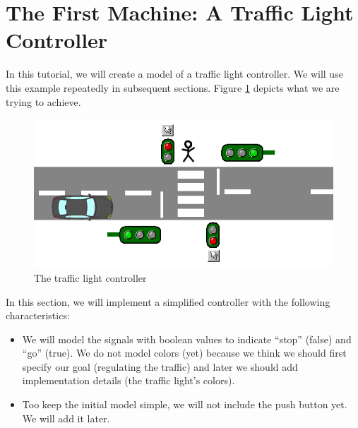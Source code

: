 \section{The First Machine: A Traffic Light Controller}
\label{tut_first_machine}



In this tutorial, we will create a model of a traffic light controller.  We will use this example repeatedly in subsequent sections.  Figure \ref{fig_tut_03_traffic_light} depicts what we are trying to achieve.

\begin{figure}[!ht]
\begin{center}
	\includegraphics[]{img/tutorial/tut_03_trafficlight.png}
	\caption{The traffic light controller}
	\label{fig_tut_03_traffic_light}
\end{center}
\end{figure}

In this section, we will implement a simplified controller with the following characteristics:
\begin{itemize}
	\item We will model the signals with boolean values to indicate ``stop'' (false) and ``go'' (true).  We do not model colors (yet) because
      we think we should first specify our goal (regulating the traffic) and later we should add implementation details (the traffic light's colors).
	\item Too keep the initial model simple, we will not include the push button yet. We will add it later.
\end{itemize}

